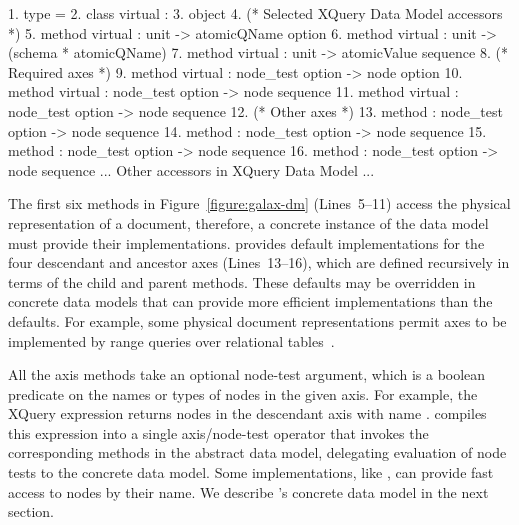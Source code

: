 \begin{figure*}
\begin{small}
\begin{code}
{ 1}. type  = 
{ 2}. class virtual  : 
{ 3}. object
{ 4}.   (* Selected XQuery Data Model accessors *)
{ 5}.   method virtual    : unit -> atomicQName option
{ 6}.   method virtual         : unit -> (schema * atomicQName)
{ 7}.   method virtual  : unit -> atomicValue sequence
\mbox{}
{ 8}.   (* Required axes *)
{ 9}.   method virtual       : node_test option -> node option
{10}.   method virtual        : node_test option -> node sequence
{11}.   method virtual    : node_test option -> node sequence
\mbox{}
{12}.   (* Other axes *)
{13}.   method   : node_test option -> node sequence
{14}.   method           : node_test option -> node sequence
{15}.   method     : node_test option -> node sequence
{16}.   method             : node_test option -> node sequence
\mbox{}
  ... Other accessors in XQuery Data Model ...
\end{code}
\end{small}
\caption{Signatures for methods in Galax's abstract node interface}
\label{figure:galax-dm}
\end{figure*}

The first six methods in Figure~\ref{figure:galax-dm} (Lines~5--11) access the
physical representation of a document, therefore, a concrete instance
of the data model must provide their implementations.  \Galax{}
provides default implementations for the four {descendant} and
ancestor axes (Lines~13--16), which are defined recursively in terms of the {child}
and {parent} methods.  These defaults may be overridden in concrete data
models that can provide more efficient implementations than the
defaults.  For example, some physical document representations permit
axes to be implemented by range queries over relational
tables~\cite{grust03staircase}.

All the axis methods take an optional node-test argument, which is a
boolean predicate on the names or types of nodes in the given axis.
For example, the XQuery expression  returns
nodes in the descendant axis with name .  \Galax{} compiles
this expression into a single axis/node-test operator that invokes the
corresponding methods in the abstract data model, delegating
evaluation of node tests to the concrete data model.  Some
implementations, like \padx{}, can provide fast access to nodes by
their name.  We describe \padx{}'s concrete data model in the next
section.

